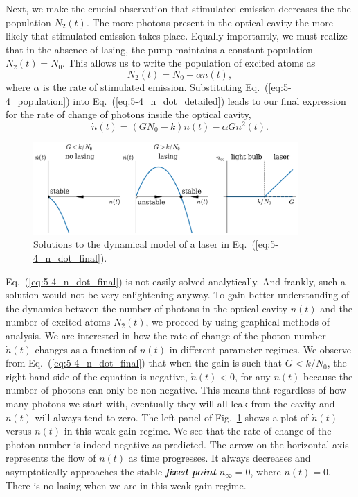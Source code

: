 Next, we make the crucial observation that stimulated emission decreases the the population $N_2(t)$.
The more photons present in the optical cavity the more likely that stimulated emission takes place.
Equally importantly, we must realize that in the absence of lasing, the pump maintains a constant population $N_2(t) = N_0$.
This allows us to write the population of excited atoms as
\begin{equation}
    N_2(t) = N_0 - \alpha n(t),
    \label{eq:5-4_population}
\end{equation}
where $\alpha$ is the rate of stimulated emission.
Substituting Eq.~(\ref{eq:5-4_population}) into Eq.~(\ref{eq:5-4_n_dot_detailed}) leads to our final expression for the rate of change of photons inside the optical cavity,
\begin{equation}
    \dot{n}(t) = (G N_0 - k) n(t) - \alpha G n^2(t).
    \label{eq:5-4_n_dot_final}
\end{equation}

\begin{figure}
    \centering
    \includegraphics[width=0.9\textwidth]{lesson5/5-4_lasing.pdf}
    \caption[Dynamical model of a laser]{Solutions to the dynamical model of a laser in Eq.~(\ref{eq:5-4_n_dot_final}).}
    \label{fig:5-4_lasing}
\end{figure}


Eq.~(\ref{eq:5-4_n_dot_final}) is not easily solved analytically.
And frankly, such a solution would not be very enlightening anyway.
To gain better understanding of the dynamics between the number of photons in the optical cavity $n(t)$ and the number of excited atoms $N_2(t)$, we proceed by using graphical methods of analysis.
We are interested in how the rate of change of the photon number $\dot{n}(t)$ changes as a function of $n(t)$ in different parameter regimes.
We observe from Eq.~(\ref{eq:5-4_n_dot_final}) that when the gain is such that $G < k / N_0$, the right-hand-side of the equation is negative, $\dot{n}(t) < 0$, for any $n(t)$ because the number of photons can only be non-negative.
This means that regardless of how many photons we start with, eventually they will all leak from the cavity and $n(t)$ will always tend to zero.
The left panel of Fig.~\ref{fig:5-4_lasing} shows a plot of $\dot{n}(t)$ versus $n(t)$ in this weak-gain regime.
We see that the rate of change of the photon number is indeed negative as predicted.
The arrow on the horizontal axis represents the flow of $n(t)$ as time progresses.
It always decreases and asymptotically approaches the stable \textit{\textbf{fixed point}} $n_{\infty} = 0$, where $\dot{n}(t) = 0$.
There is no lasing when we are in this weak-gain regime.

